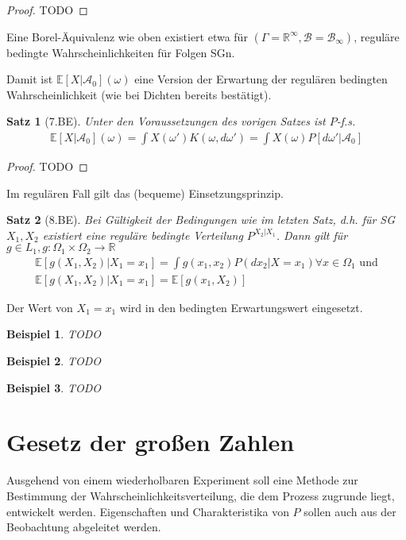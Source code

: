 \documentclass[]{article}
\newtheorem{theorem}{Satz}
\newtheorem*{example}{Beispiel}
\begin{document}
\begin{proof}
	TODO
\end{proof}

Eine Borel-Äquivalenz wie oben existiert etwa für $(\Gamma=\mathbb{R}^\infty, \mathcal{B}=\mathcal{B}_\infty)$, reguläre bedingte Wahrscheinlichkeiten für Folgen SGn.

Damit ist $\mathbb{E}[X|\mathcal{A}_0](\omega)$ eine Version der Erwartung der regulären bedingten Wahrscheinlichkeit (wie bei Dichten bereits bestätigt).

\begin{theorem}[7.BE]
	Unter den Voraussetzungen des vorigen Satzes ist $P$-f.s.
	\begin{align*}
		\mathbb{E}[X|\mathcal{A}_0](\omega) = \int X(\omega')K(\omega, d\omega') = \int X(\omega) P[d\omega'|\mathcal{A}_0]
	\end{align*}
\end{theorem}

\begin{proof}
	TODO
\end{proof}

Im regulären Fall gilt das (bequeme) Einsetzungsprinzip.

\begin{theorem}[8.BE]
	Bei Gültigkeit der Bedingungen wie im letzten Satz, d.h. für SG $X_1, X_2$ existiert eine reguläre bedingte Verteilung $P^{X_2|X_1}$. Dann gilt für $g\in L_1, g:\Omega_1\times\Omega_2 \rightarrow\mathbb{R}$
	\begin{align*}
		\mathbb{E}[g(X_1,X_2)|X_1=x_1] = \int g(x_1,x_2) P(dx_2|X=x_1) \forall x \in \Omega_1 \text{ und}\\
		\mathbb{E}[g(X_1, X_2)|X_1=x_1] = \mathbb{E}[g(x_1,X_2)]
	\end{align*}
\end{theorem}

Der Wert von $X_1=x_1$ wird in den bedingten Erwartungswert eingesetzt.

\begin{example}
	TODO
\end{example}

\begin{example}
	TODO
\end{example}

\begin{example}
	TODO
\end{example}

\section{Gesetz der großen Zahlen}
Ausgehend von einem wiederholbaren Experiment soll eine Methode zur Bestimmung der Wahrscheinlichkeitsverteilung, die dem Prozess zugrunde liegt, entwickelt werden. Eigenschaften und Charakteristika von $P$ sollen auch aus der Beobachtung abgeleitet werden.
\end{document}
